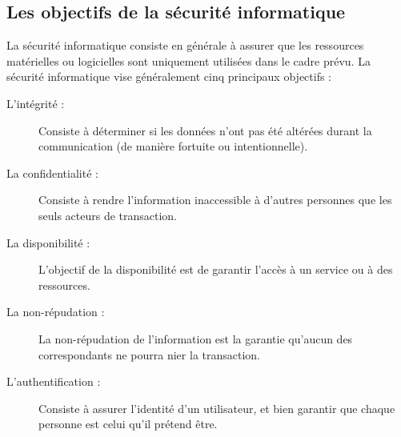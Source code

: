     \subsection{Les objectifs de la sécurité informatique}
    La sécurité informatique consiste en générale à assurer que les ressources matérielles ou logicielles sont 
    uniquement utilisées dans le cadre prévu. La sécurité informatique vise généralement cinq principaux objectifs :
    \begin{description}
        \item[L'intégrité :] Consiste à déterminer si les données n'ont pas été altérées durant la communication 
            (de manière fortuite ou intentionnelle).
        \item[La confidentialité :] Consiste à rendre l'information inaccessible à d'autres personnes que les 
            seuls acteurs de transaction.
        \item[La disponibilité :] L'objectif de la disponibilité est de garantir l'accès à un service 
            ou à des ressources.
        \item[La non-répudation :] La non-répudation de l'information est la garantie qu'aucun des correspondants 
            ne pourra nier la transaction.
        \item[L'authentification :] Consiste à assurer l'identité d'un utilisateur, et bien garantir que chaque
            personne est celui qu'il prétend être.
    \end{description} %

